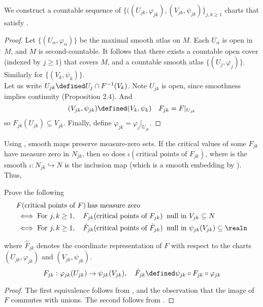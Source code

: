 \documentclass[../main-v2-manifolds.tex]{subfiles}
\begin{document}
\begin{step}\label{lee-sards-construction-charts}
    We construct a countable sequence of $\{((U_{jk}, \varphi_{jk}),(V_{jk},\psi_{jk})\}_{j,k\geq 1}$ charts that satisfy .
\end{step}
\begin{proof}
    Let $\{(U_\alpha, \varphi_\alpha)\}$ be the maximal smooth atlas on $M$. Each $U_\alpha$ is open in $M$, and $M$ is second-countable. It follows that there exists a countable open cover (indexed by $j\geq 1$) that covers $M$, and a countable smooth atlas $\{(U_j, \varphi_j)\}$. Similarly for $\{(V_k,\psi_k)\}$.\\

    Let us write $U_{jk}\defined U_j\cap F^{-1}(V_k)$. Note $U_{jk}$ is open, since smoothness implies continuity (Proposition 2.4). And
    \[
        (V_{jk}, \psi_{jk})\defined (V_k, \psi_k)\quad F_{jk}=F|_{U_{jk}}
    \]
    so $F_{jk}(U_{jk})\subseteq V_{jk}$. Finally, define $\varphi_{jk}=\varphi_j|_{U_{jk}}$.
\end{proof}

Using , smooth maps preserve measure-zero sets. If the critical values of some $F_{jk}$ have measure zero in $N_{jk}$, then so does $\iota(\text{critical points of } F_{jk})$, where is the smooth $\iota: N_{jk}\hookrightarrow N$ is the inclusion map (which is a smooth embedding by ). Thus,

\begin{step}
    Prove the following
    \begin{align*}
    &F(\text{critical points of } F)\: \text{has measure zero}
    \\ &\iff
    \text{For } j,k\geq 1,\quad F_{jk}(\text{critical points of }F_{jk})\:\text{ null in } V_{jk}\subseteq N
    \\&\iff 
    \text{For } j,k\geq 1,\quad \hat{F}_{jk}(\text{critical points of }\hat{F}_{jk})\:\text{ null in } \psi_{jk}(V_{jk})\subseteq \realn
\end{align*}

where $\hat{F}_{jk}$ denotes the coordinate representation of $F$ with respect to the charts $(U_{jk}, \varphi_{jk})$ and $(V_{jk},\psi_{jk})$.
\begin{equation}
    F_{jk}:\varphi_{jk}(U_{jk})\to \psi_{jk}(V_{jk}),\quad \hat{F}_{jk}\defined \psi_{jk}\circ F_{jk}\circ \varphi_{jk}
\end{equation}
\end{step}
\begin{proof}
    The first equivalence follows from , and the observation that the image of $F$ commutes with unions. The second follows from .
\end{proof}
\end{document}
